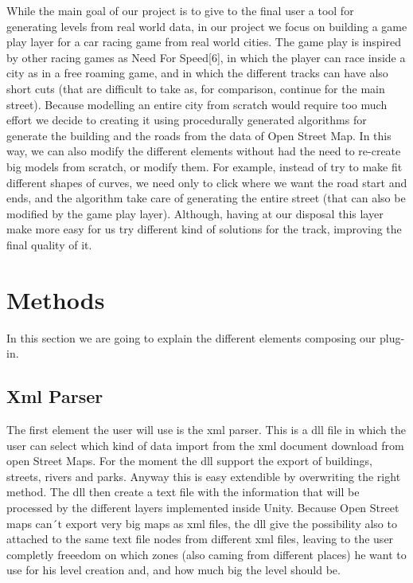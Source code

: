 \documentclass[conference]{IEEEtran}
\begin{document}
While the main goal of our project is to give to the final user a tool for generating levels from real world data, in our project we focus on building a game play layer for a car racing game from real world cities. The game play is inspired by other racing games as Need For Speed[6], in which the player can race inside a city as in a free roaming game, and in which the different tracks can have also short cuts (that are difficult to take as, for comparison, continue for the main street). Because modelling an entire city from scratch would require too much effort we decide to creating it using procedurally generated algorithms for generate the building and the roads from the data of Open Street Map. In this way, we can also modify the different elements without had the need to re-create big models from scratch, or modify them. For example, instead of try to make fit different shapes of curves, we need only to click where we want the road start and ends, and the algorithm take care of generating the entire street (that can also be modified by the game play layer). Although, having at our disposal this layer make more easy for us try different kind of solutions for the track, improving the final quality of it. 

\section{Methods}

In this section we are going to explain the different elements composing our plug-in. 

\subsection{Xml Parser}

The first element the user will use is the xml parser. This is a dll file in which the user can select which kind of data import from the xml document download from open Street Maps. For the moment the dll support the export of buildings, streets, rivers and parks. Anyway this is easy extendible by overwriting the right method.  The dll then create a text file with the information that will be processed by the different layers implemented inside Unity. Because Open Street maps can´t export very big maps as xml files, the dll give the possibility also to attached to the same text file nodes from different xml files, leaving to the user completly freeedom on which zones (also caming from different places) he want to use for his level creation and, and how much big the level should be. 
\end{document}
